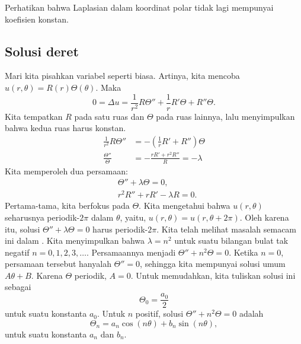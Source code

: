 Perhatikan bahwa Laplasian dalam koordinat polar tidak lagi mempunyai koefisien
konstan.

\subsection{Solusi deret}

Mari kita pisahkan variabel seperti biasa.  Artinya, kita mencoba
$u(r,\theta) = R(r)\Theta(\theta)$.  Maka
\begin{equation*}
0 = \Delta u = 
\frac{1}{r^2} R \Theta''
+
\frac{1}{r} R' \Theta
+
R'' \Theta .
\end{equation*}
Kita tempatkan $R$ pada satu ruas dan $\Theta$ pada ruas lainnya, lalu menyimpulkan
bahwa kedua ruas harus konstan.
\begin{align*}
\frac{1}{r^2} R \Theta''
& =
-
\left(\frac{1}{r} R' + R''\right) \Theta 
\\
\frac{\Theta''}{\Theta}
& =
-
\frac{r R' + r^2 R''}{R} = -\lambda
\end{align*}
Kita memperoleh dua persamaan:
\begin{align*}
& \Theta'' + \lambda \Theta = 0 ,
\\
& r^2 R'' + r R' -\lambda R = 0.
\end{align*}
Pertama-tama, kita berfokus pada $\Theta$.  Kita mengetahui bahwa $u(r,\theta)$ seharusnya
periodik-$2\pi$ dalam $\theta$, yaitu,
$u(r,\theta) = u(r,\theta+2\pi)$.  Oleh karena itu, solusi
$\Theta'' + \lambda \Theta = 0$ harus periodik-$2\pi$.
Kita telah melihat masalah semacam ini dalam .
Kita menyimpulkan
bahwa
$\lambda = n^2$ untuk suatu
bilangan bulat tak negatif $n=0,1,2,3,\ldots$.  Persamaannya menjadi
$\Theta'' + n^2 \Theta = 0$.  Ketika $n=0$, persamaan tersebut hanyalah
$\Theta'' = 0$, sehingga kita mempunyai solusi umum $A \theta + B$.  Karena
$\Theta$ periodik,
$A=0$.
Untuk memudahkan, kita tuliskan solusi ini sebagai
\begin{equation*}
\Theta_0 = \frac{a_0}{2}
\end{equation*}
untuk suatu konstanta $a_0$.  Untuk $n$ positif,
solusi
$\Theta'' + n^2 \Theta = 0$ adalah
\begin{equation*}
\Theta_n = a_n \cos(n\theta) + b_n \sin(n\theta) ,
\end{equation*}
untuk suatu konstanta $a_n$ dan $b_n$.

